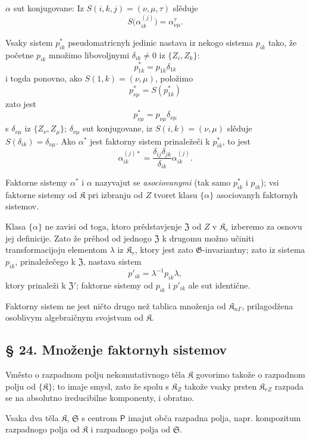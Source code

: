 \documentclass[11pt]{article}
\begin{document}
\(\alpha\) sut konjugovane: Iz \(S(i,k,j)=(\nu,\mu,\tau)\) slěduje
\[
S\bigl(\alpha_{ik}^{(j)}\bigr)=\alpha_{\nu\mu}^{\tau}.
\]

Vsaky sistem \(p_{ik}^*\) pseudomatricnyh jedinic nastava iz nekogo sistema \(p_{ik}\) tako, že početne \(p_{ik}\) množimo libovoljnymi \(\delta_{ik}\ne0\) iz \(\{Z_i,Z_k\}\):
\[
p_{1k}^*=p_{1k}\delta_{1k}
\]
i togda ponovno, ako \(S(1,k)=(\nu,\mu)\), položimo
\[
p_{\nu\mu}^*=S(p_{1k}^*)
\]
zato jest
\[
p_{\nu\mu}^*=p_{\nu\mu}\delta_{\nu\mu}
\]
s \(\delta_{\nu\mu}\) iz \(\{Z_\nu,Z_\mu\}\); \(\delta_{\nu\mu}\) sut konjugovane, iz \(S(i,k)=(\nu,\mu)\) slěduje \(S(\delta_{ik})=\delta_{\nu\mu}\). Ako \(\alpha^*\) jest faktorny sistem prinaležeči k \(p_{ik}^*\), to jest
\[
\alpha_{ik}^{(j)*}=\frac{\delta_{ij}\delta_{jk}}{\delta_{ik}}\alpha_{ik}^{(j)}.
\]

Faktorne sistemy \(\alpha^*\) i \(\alpha\) nazyvajut se \emph{asociovanymi} (tak samo \(p_{ik}^*\) i \(p_{ik}\)); vsi faktorne sistemy od \(\mathfrak K\) pri izbranju od \(Z\) tvoret klasu \(\{\alpha\}\) asociovanyh faktornyh sistemov.

Klasa \(\{\alpha\}\) ne zavisi od toga, ktoro prědstavjenje \(\mathfrak Z\) od \(Z\) v \(\mathfrak K_r\) izberemo za osnovu jej definicije. Zato že prěhod od jednogo \(\mathfrak Z\) k drugomu možno učiniti transformacijoju elementom \(\lambda\) iz \(\mathfrak K_r\), ktory jest zato \(\mathfrak G\)-invariantny; zato iz sistema \(p_{ik}\), prinaležečego k \(\mathfrak Z\), nastava sistem
\[
p'_{ik}=\lambda^{-1}p_{ik}\lambda,
\]
ktory prinaleži k \(\mathfrak Z'\); faktorne sistemy od \(p_{ik}\) i \(p'_{ik}\) ale sut identične.

Faktorny sistem ne jest ničto drugo než tablica množenja od \(\mathfrak K_{n\Gamma}\), prilagodžena osoblivym algebraičnym svojstvam od \(\mathfrak K\).

\subsection*{§ 24. Množenje faktornyh sistemov}\label{multiplikation-von-faktorensystemen}

Vměsto o razpadnom polju nekomutativnogo těla \(\mathfrak K\) govorimo takože o razpadnom polju od \(\{\mathfrak K\}\); to imaje smysl, zato že spolu s \(\mathfrak K_Z\) takože vsaky prsten \(\mathfrak K_{rZ}\) razpada se na absolutno ireducibilne komponenty, i obratno.

Vsaka dva těla \(\mathfrak K\), \(\mathfrak S\) s centrom \(\mathsf P\) imajut obča razpadna polja, napr. kompozitum razpadnogo polja od \(\mathfrak K\) i razpadnogo polja od \(\mathfrak S\).
\end{document}
